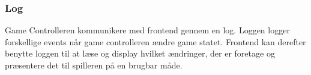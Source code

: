 \subsubsection{Log}
Game Controlleren kommunikere med frontend gennem en log. Loggen logger forskellige
events når game controlleren ændre game statet. Frontend kan derefter benytte loggen
til at læse og display hvilket ændringer, der er foretage og præsentere det til spilleren
på en brugbar måde.

\newpage
